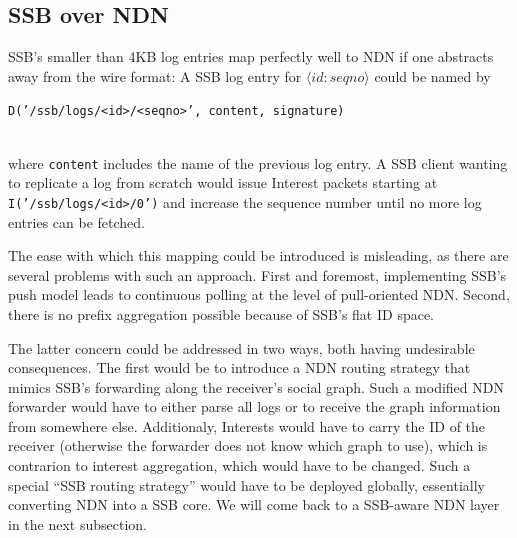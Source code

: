 \documentclass[9pt,sigconf,rewiew]{acmart}
\begin{document}
\subsection{SSB over NDN}
\label{ssect:ssb-over-ndn}

SSB's smaller than 4KB log entries map perfectly well to NDN if one
abstracts away from the wire format: A SSB
log entry for \mbox{$\langle id:seqno\rangle$} could be named by\\
  \centerline{\tt D('/ssb/logs/<id>/<seqno>', content, signature)} \\
where {\tt content} includes the name of the previous log entry.
%
%
A SSB client wanting to replicate a log from scratch would issue
Interest packets starting at {\tt I('/ssb/logs/<id>/0')} and increase the
sequence number until no more log entries can be fetched.

The ease with which this mapping could be introduced is misleading, as
there are several problems with such an approach. First and foremost,
implementing SSB's push model leads to continuous polling at the level
of pull-oriented NDN. Second, there is no prefix aggregation possible
because of SSB's flat ID space.

The latter concern could be addressed in two ways, both having
undesirable consequences. The first would be to introduce a NDN
routing strategy that mimics SSB's forwarding along the receiver's
social graph. Such a modified NDN forwarder would have to either parse
all logs or to receive the graph information from somewhere
else. Additionaly, Interests would have to carry the ID of the
receiver (otherwise the forwarder does not know which graph to use),
which is contrarion to interest aggregation, which would have to be
changed.  Such a special ``SSB routing strategy'' would have to be
deployed globally, essentially converting NDN into a SSB core. We will
come back to a SSB-aware NDN layer in the next subsection.
\end{document}
